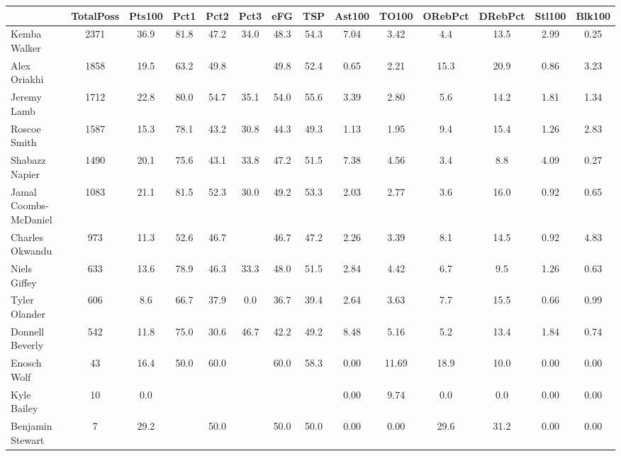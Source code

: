 \documentclass[10pt,letterpaper]{article}
\begin{document}
\begin{table}[ht]
\begin{center}
\begin{tabular}{lccccccccccccc}
  \hline
 & TotalPoss & Pts100 & Pct1 & Pct2 & Pct3 & eFG & TSP & Ast100 & TO100 & ORebPct & DRebPct & Stl100 & Blk100 \\ 
  \hline
Kemba Walker & 2371 & 36.9 & 81.8 & 47.2 & 34.0 & 48.3 & 54.3 & 7.04 & 3.42 & 4.4 & 13.5 & 2.99 & 0.25 \\ 
  Alex Oriakhi & 1858 & 19.5 & 63.2 & 49.8 &  & 49.8 & 52.4 & 0.65 & 2.21 & 15.3 & 20.9 & 0.86 & 3.23 \\ 
  Jeremy Lamb & 1712 & 22.8 & 80.0 & 54.7 & 35.1 & 54.0 & 55.6 & 3.39 & 2.80 & 5.6 & 14.2 & 1.81 & 1.34 \\ 
  Roscoe Smith & 1587 & 15.3 & 78.1 & 43.2 & 30.8 & 44.3 & 49.3 & 1.13 & 1.95 & 9.4 & 15.4 & 1.26 & 2.83 \\ 
  Shabazz Napier & 1490 & 20.1 & 75.6 & 43.1 & 33.8 & 47.2 & 51.5 & 7.38 & 4.56 & 3.4 & 8.8 & 4.09 & 0.27 \\ 
  Jamal Coombs-McDaniel & 1083 & 21.1 & 81.5 & 52.3 & 30.0 & 49.2 & 53.3 & 2.03 & 2.77 & 3.6 & 16.0 & 0.92 & 0.65 \\ 
  Charles Okwandu & 973 & 11.3 & 52.6 & 46.7 &  & 46.7 & 47.2 & 2.26 & 3.39 & 8.1 & 14.5 & 0.92 & 4.83 \\ 
  Niels Giffey & 633 & 13.6 & 78.9 & 46.3 & 33.3 & 48.0 & 51.5 & 2.84 & 4.42 & 6.7 & 9.5 & 1.26 & 0.63 \\ 
  Tyler Olander & 606 & 8.6 & 66.7 & 37.9 & 0.0 & 36.7 & 39.4 & 2.64 & 3.63 & 7.7 & 15.5 & 0.66 & 0.99 \\ 
  Donnell Beverly & 542 & 11.8 & 75.0 & 30.6 & 46.7 & 42.2 & 49.2 & 8.48 & 5.16 & 5.2 & 13.4 & 1.84 & 0.74 \\ 
  Enosch Wolf & 43 & 16.4 & 50.0 & 60.0 &  & 60.0 & 58.3 & 0.00 & 11.69 & 18.9 & 10.0 & 0.00 & 0.00 \\ 
  Kyle Bailey & 10 & 0.0 &  &  &  &  &  & 0.00 & 9.74 & 0.0 & 0.0 & 0.00 & 0.00 \\ 
  Benjamin Stewart & 7 & 29.2 &  & 50.0 &  & 50.0 & 50.0 & 0.00 & 0.00 & 29.6 & 31.2 & 0.00 & 0.00 \\ 
   \hline
\end{tabular}
\end{center}
\end{table}
\end{document}
